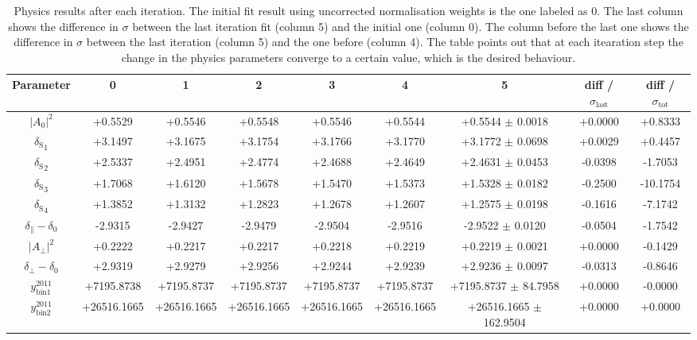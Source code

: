 \begin{landscape}
\begin{table}[h!]
    \center\footnotesize
 \caption{\small Physics results after each iteration. The initial fit result using uncorrected normalisation weights is the one labeled as 0. The last column shows the difference in $\sigma$ between the last iteration fit (column 5) and the initial one (column 0). The column before the last one shows the difference in $\sigma$ between the last iteration (column 5) and the one before (column 4). The table points out that at each itearation step the change in the physics parameters converge to a certain value, which is the desired behaviour.}
  \begin{tabular}{c|c|c|c|c|c|c|c|c}
    Parameter  & 0   & 1   & 2  & 3 &4  &5    &  diff / $\sigma_{\text{last}}$ & diff / $\sigma_{\text{tot}}$  \\
\hline
    $|A_0|^2$                          & +0.5529  & +0.5546  & +0.5548  & +0.5546  & +0.5544  & +0.5544 $\pm$ 0.0018 & +0.0000 & +0.8333 \\
    ${\delta_\text{S}}_1$              & +3.1497  & +3.1675  & +3.1754  & +3.1766  & +3.1770  & +3.1772 $\pm$ 0.0698 & +0.0029 & +0.4457 \\
    ${\delta_\text{S}}_2$              & +2.5337  & +2.4951  & +2.4774  & +2.4688  & +2.4649  & +2.4631 $\pm$ 0.0453 & -0.0398 & -1.7053 \\
    ${\delta_\text{S}}_3$              & +1.7068  & +1.6120  & +1.5678  & +1.5470  & +1.5373  & +1.5328 $\pm$ 0.0182 & -0.2500 & -10.1754 \\
    ${\delta_\text{S}}_4$              & +1.3852  & +1.3132  & +1.2823  & +1.2678  & +1.2607  & +1.2575 $\pm$ 0.0198 & -0.1616 & -7.1742 \\
    $\delta_\parallel-\delta_0$        & -2.9315  & -2.9427  & -2.9479  & -2.9504  & -2.9516  & -2.9522 $\pm$ 0.0120 & -0.0504 & -1.7542 \\
    $|A_\perp|^2$                      & +0.2222  & +0.2217  & +0.2217  & +0.2218  & +0.2219  & +0.2219 $\pm$ 0.0021 & +0.0000 & -0.1429 \\
    $\delta_\perp-\delta_0$            & +2.9319  & +2.9279  & +2.9256  & +2.9244  & +2.9239  & +2.9236 $\pm$ 0.0097 & -0.0313 & -0.8646 \\
    $y_{\text{bin}1}^{2011}$           & +7195.8738  & +7195.8737  & +7195.8737  & +7195.8737  & +7195.8737  & +7195.8737 $\pm$ 84.7958 & +0.0000 & -0.0000 \\
    $y_{\text{bin}2}^{2011}$           & +26516.1665  & +26516.1665  & +26516.1665  & +26516.1665  & +26516.1665  & +26516.1665 $\pm$ 162.9504 & +0.0000 & +0.0000 \\

\end{tabular}
\end{table}
\end{landscape}
